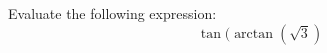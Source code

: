 \documentclass{ximera}
\author{David Kish}
\begin{document}
\begin{exercise}
Evaluate the following expression:
\[
\tan(\arctan(\sqrt{3})
\]
\begin{multipleChoice}
\end{multipleChoice}
\end{exercise}
\end{document}
